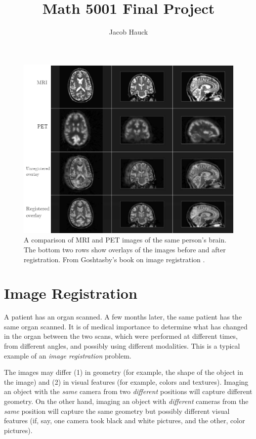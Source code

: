 \documentclass{article}
\author{Jacob Hauck}
\title{Math 5001 Final Project}
\begin{document}
	\maketitle
	
	\begin{figure}
		\begin{center}
			\includegraphics[width=\textwidth]{MRI_PET_Comparison.png}
		\end{center}
		\caption{A comparison of MRI and PET images of the same person's brain. The bottom two rows show overlays of the images before and after registration. From Goshtasby's book on image registration \cite{goshtasby2005}.}\label{fig:mri_pet_comparison}
	\end{figure}

	\section{Image Registration}

	A patient has an organ scanned. A few months later, the same patient has the same organ scanned. It is of medical importance to determine what has changed in the organ between the two scans, which were performed at different times, from different angles, and possibly using different modalities. This is a typical example of an \textit{image registration} problem.
	
	The images may differ (1) in geometry (for example, the shape of the object in the image) and (2) in  visual features (for example, colors and textures). Imaging an object with the \textit{same} camera from two \textit{different} positions will capture different geometry. On the other hand, imaging an object with \textit{different} cameras from the \textit{same} position will capture the same geometry but possibly different visual features (if, say, one camera took black and white pictures, and the other, color pictures).
	
\end{document}
